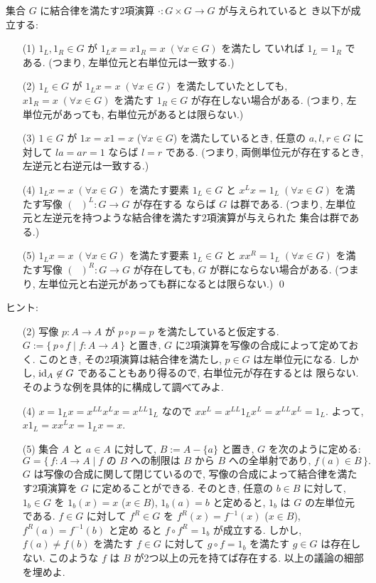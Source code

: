 \documentclass[12pt,twoside]{jarticle}
\def\setminus{-}
\def\id{\text{\rm id}}
\begin{document}
\begin{question}
  集合 $G$ に結合律を満たす2項演算 $\cdot:G\times G\to G$ が与えられていると
  き以下が成立する:
  \begin{enumerate}
  \item[(1)] $1_L,1_R\in G$ が $1_Lx = x1_R = x\;(\forall x\in G)$ を満たし
    ていれば $1_L=1_R$ である.  (つまり, 左単位元と右単位元は一致する.)
  \item[(2)] $1_L\in G$ が $1_Lx = x\;(\forall x\in G)$ を満たしていたとしても,
    $x1_R = x\;(\forall x\in G)$ を満たす $1_R\in G$ が存在しない場合がある.
    (つまり, 左単位元があっても, 右単位元があるとは限らない.)
  \item[(3)] $1\in G$ が $1x=x1=x$ ($\forall x\in G$) を満たしているとき,
    任意の $a,l,r\in G$ に対して $la=ar=1$ ならば $l=r$ である. 
    (つまり, 両側単位元が存在するとき, 左逆元と右逆元は一致する.)
  \item[(4)] $1_Lx=x\;(\forall x\in G)$ を満たす要素 $1_L\in G$ と %
    $x^Lx=1_L\;(\forall x\in G)$ を満たす写像 $(\;\;)^L:G\to G$ が存在する
    ならば $G$ は群である.
    (つまり, 左単位元と左逆元を持つような結合律を満たす2項演算が与えられた
    集合は群である.)
  \item[(5)] $1_Lx=x\;(\forall x\in G)$ を満たす要素 $1_L\in G$ と %
    $xx^R=1_L\;(\forall x\in G)$ を満たす写像 $(\;\;)^R:G\to G$ が存在しても, 
    $G$ が群にならない場合がある.
    (つまり, 左単位元と右逆元があっても群になるとは限らない.)
    \qed
  \end{enumerate}
\end{question}

\noindent ヒント: 
\begin{itemize}
\item[(2)] 写像 $p:A\to A$ が $p\circ p = p$ を満たしていると仮定する.
  $G := \{\, p\circ f\mid f:A\to A\,\}$ と置き, 
  $G$ に2項演算を写像の合成によって定めておく. 
  このとき, その2項演算は結合律を満たし, $p\in G$ は左単位元になる.
  しかし, $\id_A\not\in G$ であることもあり得るので, 右単位元が存在するとは
  限らない. そのような例を具体的に構成して調べてみよ.
\item[(4)]
  $x=1_Lx=x^{LL}x^Lx=x^{LL}1_L$ なので $xx^L=x^{LL}1_Lx^L=x^{LL}x^L=1_L$. 
  よって, $x1_L=xx^Lx=1_Lx=x$.
\item[(5)] 集合 $A$ と $a\in A$ に対して, $B:=A\setminus\{a\}$ と置き,
  $G$ を次のように定める:
  \begin{equation*}
    G = \{\, f:A\to A \mid
    \text{$f$ の $B$ への制限は $B$ から $B$ への全単射であり, 
          $f(a)\in B$} \,\}.
  \end{equation*}
  $G$ は写像の合成に関して閉じているので, 写像の合成によって結合律を満た
  す2項演算を $G$ に定めることができる.
  そのとき, 任意の $b\in B$ に対して, 
  $1_b\in G$ を $1_b(x)=x$ ($x\in B$), $1_b(a)=b$ と定めると, 
  $1_b$ は $G$ の左単位元である. 
  $f\in G$ に対して $f^R\in G$ を %
  $f^R(x)=f^{-1}(x)$ ($x\in B$), $f^R(a)=f^{-1}(b)$ と定め
  ると $f\circ f^R = 1_b$ が成立する. 
  しかし, $f(a)\ne f(b)$ を満たす $f\in G$ に対して %
  $g\circ f = 1_b$ を満たす $g\in G$ は存在しない.
  このような $f$ は $B$ が2つ以上の元を持てば存在する.
  以上の議論の細部を埋めよ.
\end{itemize}
\end{document}
